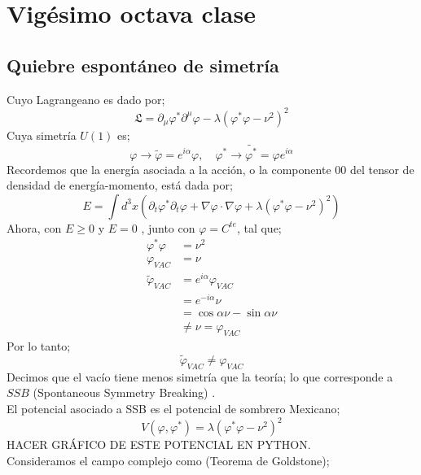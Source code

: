\documentclass[../main.tex]{subfiles}
\begin{document}
\section{Vigésimo octava clase}
\subsection{Quiebre espontáneo de simetría}
Cuyo Lagrangeano es dado por;
\begin{equation}
  \mathfrak{L} = \partial_\mu \varphi^* \partial^\mu \varphi - \lambda \left( \varphi^* \varphi - \nu^2 \right)^2
 \end{equation}
Cuya simetría $U(1)$ es;
\begin{equation}
  \varphi \rightarrow \tilde{\varphi}= e^{i\alpha}\varphi, \quad \varphi^* \rightarrow \tilde{\varphi^*}=\varphi e^{i\alpha}
 \end{equation}
Recordemos que la energía asociada a la acción, o la componente $00$ del tensor de densidad de energía-momento, está dada por;
\begin{equation}
  E = \int d^3x \left( \partial_t\varphi^* \partial_t \varphi + \nabla \varphi \cdot \nabla \varphi + \lambda \left( \varphi^* \varphi - \nu^2 \right)^2 \right)
 \end{equation}
Ahora, con $E\geq 0$  y $E=0$ , junto  con $\varphi=C^{te}$, tal que;
\begin{align*}
  \varphi^* \varphi&  = \nu^2 \\
  \varphi_{VAC} & = \nu \\
  \tilde{\varphi}_{VAC} & = e^{i\alpha}\varphi_{VAC} \\
& = e^{-i\alpha}\nu \\
  & = \cos{\alpha}\nu - \sin{\alpha}\nu \\
  & \neq \nu = \varphi_{VAC}
\end{align*}
Por lo tanto;
\begin{equation}
  \tilde{\varphi}_{VAC} \neq \varphi_{VAC}
 \end{equation}
 Decimos que el vacío tiene menos simetría que la teoría; lo que corresponde a $SSB$ (Spontaneous Symmetry Breaking) . \\
 El potencial asociado a SSB es el potencial de sombrero Mexicano;
 \begin{equation}
   V(\varphi,\varphi^*) = \lambda \left( \varphi^* \varphi - \nu^2 \right)^2
  \end{equation}
  HACER GRÁFICO DE ESTE POTENCIAL EN PYTHON. \\
Consideramos el campo complejo como (Teorema de Goldstone);
\end{document}
